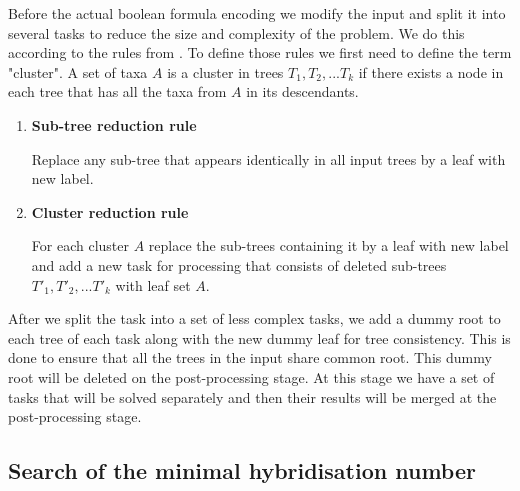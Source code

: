 \documentclass[runningheads, envcountsame, a4paper]{llncs}
\begin{document}
Before the actual boolean formula encoding we modify the input and split it into several tasks to reduce the size 
and complexity of the problem. We do this according to the rules from \cite {bonet2009efficiently}. To define those 
rules we first need to define the term "cluster". A set of taxa $A$ is a cluster in trees $T_1, T_2, ... T_k$ if there 
exists a node in each tree that has all the taxa from $A$ in its descendants.

\begin{enumerate}

\item \textbf{Sub-tree reduction rule}

Replace any sub-tree that appears identically in all input trees by a leaf with new label.

\item \textbf{Cluster reduction rule}

For each cluster $A$ replace the sub-trees containing it by a leaf with new label and add a new task for processing 
that consists of deleted sub-trees $T'_1, T'_2, ... T'_k$ with leaf set $A$.

\end{enumerate}

After we split the task into a set of less complex tasks, we add a dummy root to each tree of each task along with 
the new dummy leaf for tree consistency. This is done to ensure that all the trees in the input share common root. 
This dummy root will be deleted on the post-processing stage. At this stage we have a set of tasks that will be solved 
separately and then their results will be merged at the post-processing stage.

\subsection{Search of the minimal hybridisation number}
\end{document}

